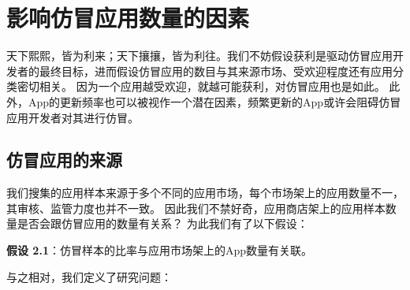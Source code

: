 \noindent{}

\section{影响仿冒应用数量的因素}
\label{sec:quantitativeStudy}
天下熙熙，皆为利来；天下攘攘，皆为利往。我们不妨假设获利是驱动仿冒应用开发者的最终目标，进而假设仿冒应用的数目与其来源市场、受欢迎程度还有应用分类密切相关。
因为一个应用越受欢迎，就越可能获利，对仿冒应用也是如此。
此外，App的更新频率也可以被视作一个潜在因素，频繁更新的App或许会阻碍仿冒应用开发者对其进行仿冒。

\subsection{仿冒应用的来源}

我们搜集的应用样本来源于多个不同的应用市场，每个市场架上的应用数量不一，其审核、监管力度也并不一致。
因此我们不禁好奇，应用商店架上的应用样本数量是否会跟仿冒应用的数量有关系？
为此我们有了以下假设：

{\bf 假设 2.1}：仿冒样本的比率与应用市场架上的App数量有关联。

与之相对，我们定义了研究问题：

